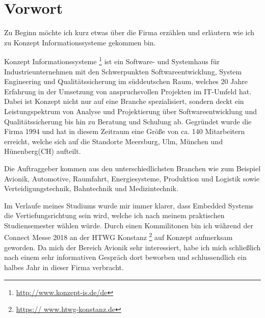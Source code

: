 \chapter{Vorwort}
\label{ch:0}

Zu Beginn möchte ich kurz etwas über die Firma erzählen und erläutern wie ich 
zu Konzept Informationssysteme gekommen bin.

Konzept Informationssysteme \footnote{\url{http://www.konzept-is.de/de}} ist ein Software- und 
Systemhaus für Industrieunternehmen mit den Schwerpunkten Softwareentwicklung, System Engineering 
und Qualitätssicherung im süddeutschen Raum, welches 20 Jahre Erfahrung in der Umsetzung von 
anspruchsvollen Projekten im IT-Umfeld hat. Dabei ist Konzept nicht nur auf eine Branche 
spezialisiert, sondern deckt ein Leistungspektrum von Analyse und Projektierung über 
Softwareentwicklung und Qualitätssicherung bis hin zu Beratung und Schulung ab.
Gegründet wurde die Firma 1994 und hat in diesem Zeitraum eine Größe von ca. 140 Mitarbeitern 
erreicht, welche sich auf die Standorte Meersburg, Ulm, München und Hünenberg(CH) aufteilt. 

Die Auftraggeber kommen aus den unterschiedlichsten Branchen wie zum Beispiel Avionik, 
Automotive, Raumfahrt, Energiesysteme, Produktion und Logistik sowie Verteidigungstechnik, 
Bahntechnik und Medizintechnik.

Im Verlaufe meines Studiums wurde mir immer klarer, dass Embedded Systems die Vertiefungsrichtung 
sein wird, welche ich nach meinem praktischen Studiensemester wählen würde. Durch einen 
Kommilitonen bin ich während der Connect Messe 2018 an der HTWG Konstanz \footnote{\url{https://
www.htwg-konstanz.de}} auf Konzept aufmerksam geworden. Da mich der Bereich Avionik sehr 
interessiert, habe ich mich schließlich nach einem sehr informativen Gespräch dort beworben und 
schlussendlich ein halbes Jahr in dieser Firma verbracht. 